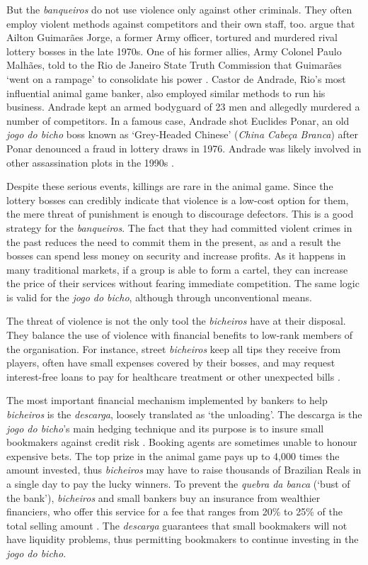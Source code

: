 \documentclass[a4paper,12pt]{article}
\begin{document}
But the \textit{banqueiros} do not use violence only against other criminals. They often employ violent methods against competitors and their own staff, too. \citet{jupiara2015poroes} argue that Ailton Guimarães Jorge, a former Army officer, tortured and murdered rival lottery bosses in the late 1970s. One of his former allies, Army Colonel Paulo Malhães, told to the Rio de Janeiro State Truth Commission that Guimarães `went on a rampage' to consolidate his power \citep{belem2015guimaraes}. Castor de Andrade, Rio's most influential animal game banker, also employed similar methods to run his business. Andrade kept an armed bodyguard of 23 men and allegedly murdered a number of competitors. In a famous case, Andrade shot Euclides Ponar, an old \textit{jogo do bicho} boss known as `Grey-Headed Chinese' (\textit{China Cabe\c{c}a Branca}) after Ponar denounced a fraud in lottery draws in 1976. Andrade was likely involved in other assassination plots in the 1990s  \citep{globo2017castor}. 

Despite these serious events, killings are rare in the animal game. Since the lottery bosses can credibly indicate that violence is a low-cost option for them, the mere threat of punishment is enough to discourage defectors. This is a good strategy for the \textit{banqueiros}. The fact that they had committed violent crimes in the past reduces the need to commit them in the present, as and a result the bosses can spend less money on security and increase profits. As it happens in many traditional markets, if a group is able to form a cartel, they can increase the price of their services without fearing immediate competition. The same logic is valid for the \textit{jogo do bicho}, although through unconventional means.  

The threat of violence is not the only tool the \textit{bicheiros} have at their disposal. They balance the use of violence with financial benefits to low-rank members of the organisation. For instance, street \emph{bicheiros} keep all tips they receive from players, often have small expenses covered by their bosses, and may request interest-free loans to pay for healthcare treatment or other unexpected bills \citep{labronici2012paratodos}.

The most important financial mechanism implemented by bankers to help \emph{bicheiros} is the \emph{descarga}, loosely translated as `the unloading'. The descarga is the \emph{jogo do bicho}'s main hedging technique and its purpose is to insure small bookmakers against credit risk \citetext{\citealp[59]{labronici2012paratodos}; \citealp[178]{magalhaes2005ganhou}}. Booking agents are sometimes unable to honour expensive bets. The top prize in the animal game pays up to 4,000 times the amount invested, thus \emph{bicheiros} may have to raise thousands of Brazilian Reals in a single day to pay the lucky winners. To prevent the \emph{quebra da banca} (`bust of the bank'), \emph{bicheiros} and small bankers buy an insurance from wealthier financiers, who offer this service for a fee that ranges from 20\% to 25\% of the total selling amount \citep{fsp2006descarga}. The \emph{descarga} guarantees that small bookmakers will not have liquidity problems, thus permitting bookmakers to continue investing in the \emph{jogo do bicho}.
\end{document}
